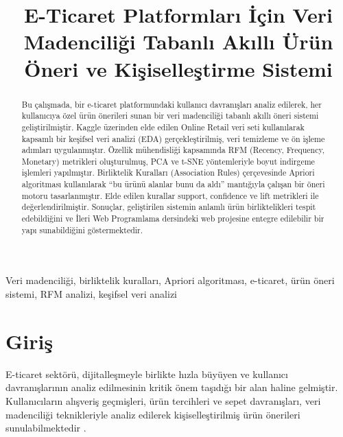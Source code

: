 \documentclass[conference]{IEEEtran}
\begin{document}
\title{E-Ticaret Platformları İçin Veri Madenciliği Tabanlı Akıllı Ürün Öneri ve Kişiselleştirme Sistemi}

\author{
}

\maketitle

\begin{abstract}
Bu çalışmada, bir e-ticaret platformundaki kullanıcı davranışları analiz edilerek, her kullanıcıya özel ürün önerileri sunan bir veri madenciliği tabanlı akıllı öneri sistemi geliştirilmiştir. Kaggle üzerinden elde edilen Online Retail veri seti kullanılarak kapsamlı bir keşifsel veri analizi (EDA) gerçekleştirilmiş, veri temizleme ve ön işleme adımları uygulanmıştır. Özellik mühendisliği kapsamında RFM (Recency, Frequency, Monetary) metrikleri oluşturulmuş, PCA ve t-SNE yöntemleriyle boyut indirgeme işlemleri yapılmıştır. Birliktelik Kuralları (Association Rules) çerçevesinde Apriori algoritması kullanılarak ``bu ürünü alanlar bunu da aldı'' mantığıyla çalışan bir öneri motoru tasarlanmıştır. Elde edilen kurallar support, confidence ve lift metrikleri ile değerlendirilmiştir. Sonuçlar, geliştirilen sistemin anlamlı ürün birliktelikleri tespit edebildiğini ve İleri Web Programlama dersindeki web projesine entegre edilebilir bir yapı sunabildiğini göstermektedir.
\end{abstract}

\begin{IEEEkeywords}
Veri madenciliği, birliktelik kuralları, Apriori algoritması, e-ticaret, ürün öneri sistemi, RFM analizi, keşifsel veri analizi
\end{IEEEkeywords}

\section{Giriş}

E-ticaret sektörü, dijitalleşmeyle birlikte hızla büyüyen ve kullanıcı davranışlarının analiz edilmesinin kritik önem taşıdığı bir alan haline gelmiştir. Kullanıcıların alışveriş geçmişleri, ürün tercihleri ve sepet davranışları, veri madenciliği teknikleriyle analiz edilerek kişiselleştirilmiş ürün önerileri sunulabilmektedir \cite{han2011}.
\end{document}
